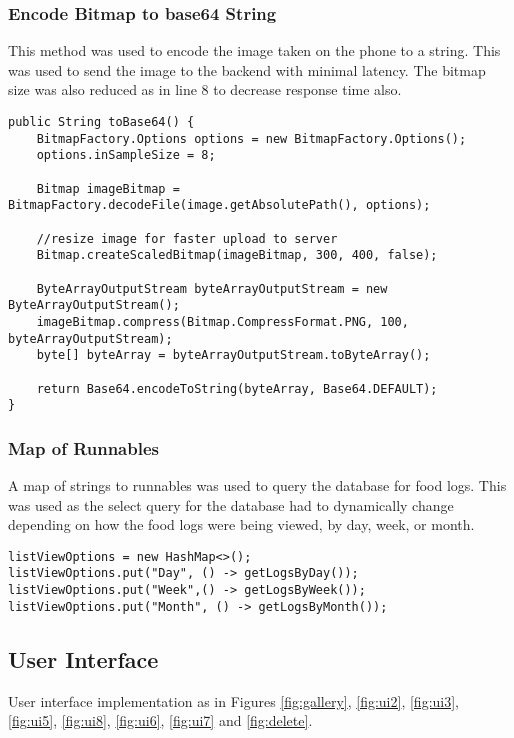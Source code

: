 \tocless\subsubsection{Encode Bitmap to base64 String}
This method was used to encode the image taken on the phone to a string.
This was used to send the image to the backend with minimal latency.
The bitmap size was also reduced as in line 8 to decrease response time also.
\begin{lstlisting}[style=Java]
public String toBase64() {
    BitmapFactory.Options options = new BitmapFactory.Options();
    options.inSampleSize = 8;

    Bitmap imageBitmap = BitmapFactory.decodeFile(image.getAbsolutePath(), options);

    //resize image for faster upload to server
    Bitmap.createScaledBitmap(imageBitmap, 300, 400, false);
    
    ByteArrayOutputStream byteArrayOutputStream = new ByteArrayOutputStream();
    imageBitmap.compress(Bitmap.CompressFormat.PNG, 100, byteArrayOutputStream);
    byte[] byteArray = byteArrayOutputStream.toByteArray();

    return Base64.encodeToString(byteArray, Base64.DEFAULT);
}
\end{lstlisting}

\tocless\subsubsection{Map of Runnables}
A map of strings to runnables was used to query the database for food logs.
This was used as the select query for the database had to dynamically change depending on how the food logs were being viewed, by day, week, or month.
\begin{lstlisting}[style=Java]
listViewOptions = new HashMap<>();
listViewOptions.put("Day", () -> getLogsByDay());
listViewOptions.put("Week",() -> getLogsByWeek());
listViewOptions.put("Month", () -> getLogsByMonth());
\end{lstlisting}

\tocless\subsection{User Interface}
User interface implementation as in Figures \ref{fig:gallery}, \ref{fig:ui2}, \ref{fig:ui3}, \ref{fig:ui5}, \ref{fig:ui8}, \ref{fig:ui6}, \ref{fig:ui7} and \ref{fig:delete}.

